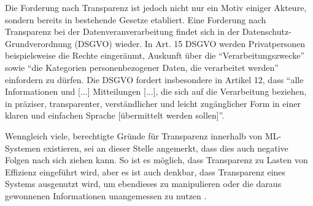 Die Forderung nach Transparenz ist jedoch nicht nur ein Motiv einiger Akteure, sondern bereits in bestehende Gesetze etabliert. Eine Forderung nach Transparenz bei der Datenveranverarbeitung findet sich in der Datenschutz-Grundverordnung (DSGVO) wieder. In Art. 15 DSGVO werden Privatpersonen beispielsweise die Rechte eingeräumt, Auskunft über die \enquote{Verarbeitungszwecke} sowie \enquote{die Kategorien personenbezogener Daten, die verarbeitet werden} einfordern zu dürfen. Die DSGVO fordert insbesondere in Artikel 12, dass \enquote{alle Informationen und [...] Mitteilungen [...], die sich auf die Verarbeitung beziehen, in präziser, transparenter, verständlicher und leicht zugänglicher Form in einer klaren und einfachen Sprache [übermittelt werden sollen]}.

Wenngleich viele, berechtigte Gründe für Transparenz innerhalb von ML-Systemen existieren, sei an dieser Stelle angemerkt, dass dies auch negative Folgen nach sich ziehen kann. So ist es möglich, dass Transparenz zu Lasten von Effizienz eingeführt wird, aber es ist auch denkbar, dass Transparenz eines Systems ausgenutzt wird, um ebendieses zu manipulieren oder die daraus gewonnenen Informationen unangemessen zu nutzen \cite{weller2019transparency}.
